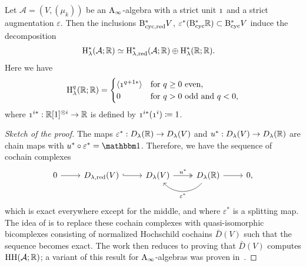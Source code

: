 \documentclass[\MainFolder/Text.tex]{subfiles}
\begin{document}
\begin{Proposition}\label{Prop:Reduced}
Let $\mathcal{A}= (V,(\mu_k))$ be an $\mathrm{A}_\infty$-algebra with a strict unit $\NOne$ and a strict augmentation $\varepsilon$. Then the inclusions $\mathrm{B}_{\mathrm{cyc},\mathrm{red}}^* V$, $\varepsilon^*(\mathrm{B}_{\mathrm{cyc}}^* \mathbb{R}) \subset \mathrm{B}_{\mathrm{cyc}}^* V$ induce the decomposition
$$\begin{aligned}
\mathrm{H}_\lambda^*(\mathcal{A};\mathbb{R}) &\simeq \mathrm{H}_{\lambda, \mathrm{red}}^*(\mathcal{A};\mathbb{R}) \oplus \mathrm{H}_\lambda^*(\mathbb{R};\mathbb{R}).
\end{aligned} $$
Here we have
\begin{equation*}
 \H_\lambda^{q}(\R; \R) = \begin{cases} \langle \NOne^{q+1*} \rangle & \text{for }q\ge 0 \text{ even}, \\
0 & \text{for }q> 0 \text{ odd and }q<0, \\
\end{cases}
\end{equation*}
where $\NOne^{i*}: \R[1]^{\otimes i} \rightarrow \R$ is defined by $\NOne^{i*}(\NOne^{i}) \coloneqq 1$.
\end{Proposition}
\begin{proof}[Sketch of the proof]
The maps $\varepsilon^*: D_\lambda(\mathbb{R}) \rightarrow D_\lambda(V)$ and $u^*: D_\lambda(V) \rightarrow D_\lambda(\mathbb{R})$ are chain maps with $u^*\circ \varepsilon^* = \Id$. Therefore, we have the sequence of cochain complexes
\begin{equation}\label{Eq:UnitAugSS}
\begin{tikzcd}
 0 \arrow{r} &D_{\lambda,\RedMRM}(V) \arrow[hook]{r} & D_\lambda(V) \arrow[two heads]{r}{u^*} & \arrow[bend left=50]{l}{\varepsilon^*} D_\lambda(\R) \arrow{r} & 0, 
\end{tikzcd}
\end{equation}
which is exact everywhere except for the middle, and where $\varepsilon^*$ is a splitting map. The idea of \cite{LodayCyclic} is to replace these cochain complexes with quasi-isomorphic bicomplexes consisting of normalized Hochschild cochains $\bar{D}(V)$ such that the sequence becomes exact. The work then reduces to proving that $\bar{D}(V)$ computes $\mathrm{H}\mathrm{H}(\mathcal{A};\mathbb{R})$; a variant of this result for $\mathrm{A}_\infty$-algebras was proven in~\cite{Lazarev2003}.
\end{proof}
\end{document}
